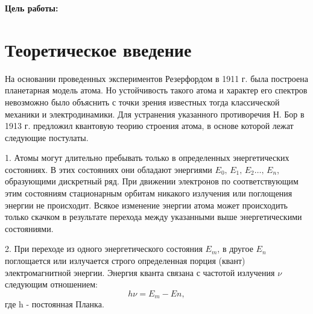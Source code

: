 




\def\labauthors{Войтович Д.А., Карусевич А.А., Разова А.А}
\def\labgroup{430}
\def\labnumber{5}
\def\labtheme{Опыт Франка-Герца}


{\bfseries Цель работы:} 

\section{Теоретическое введение}

На основании проведенных экспериментов Резерфордом в 1911 г. была построена планетарная модель атома. Но устойчивость такого атома и характер его спектров невозможно было объяснить с точки зрения известных тогда классической механики и электродинамики. Для устранения указанного противоречия Н. Бор в 1913 г. предложил квантовую теорию строения атома, в основе которой лежат следующие постулаты.


1.	Атомы могут длительно пребывать только в определенных энергетических состояниях. В этих состояниях они обладают энергиями $E_0,\,E_1,\,E_2\dots,\,E_n$, образующими дискретный ряд. При движении электронов по соответствующим этим состояниям стационарным орбитам никакого излучения или поглощения энергии не происходит. Всякое изменение энергии атома может происходить только скачком в результате перехода между указанными выше энергетическими состояниями.


2.	При переходе из одного энергетического состояния $E_m$, в другое $E_n$ поглощается или излучается строго определенная порция (квант) электромагнитной энергии. Энергия кванта связана с частотой излучения $\nu$ следующим отношением: $$h\nu=E_m-En,$$ где h - постоянная Планка.

